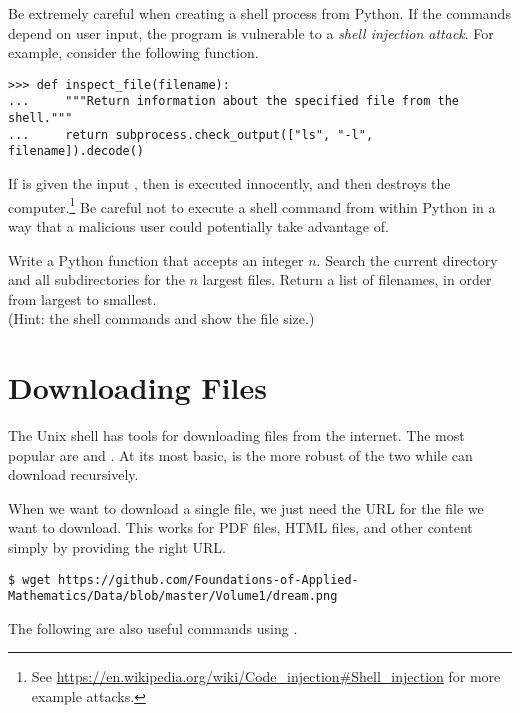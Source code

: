 \begin{warn}
Be extremely careful when creating a shell process from Python.
If the commands depend on user input, the program is vulnerable to a \emph{shell injection attack}.
For example, consider the following function.
\begin{lstlisting}
>>> def inspect_file(filename):
...     """Return information about the specified file from the shell."""
...     return subprocess.check_output(["ls", "-l", filename]).decode()
\end{lstlisting}
If  is given the input , then  is executed innocently, and then  destroys the computer.\footnote{See \url{https://en.wikipedia.org/wiki/Code_injection\#Shell_injection} for more example attacks.}
Be careful not to execute a shell command from within Python in a way that a malicious user could potentially take advantage of.
\end{warn}


\begin{problem}
Write a Python function that accepts an integer $n$.
Search the current directory and all subdirectories for the $n$ largest files.
Return a list of filenames, in order from largest to smallest.
\\(Hint: the shell commands  and  show the file size.)
\end{problem}

\section*{Downloading Files} %

The Unix shell has tools for downloading files from the internet.
The most popular are  and .
At its most basic,  is the more robust of the two while  can download recursively.

When we want to download a single file, we just need the URL for the file we want to download.
This works for PDF files, HTML files, and other content simply by providing the right URL.

\begin{lstlisting}
$ wget https://github.com/Foundations-of-Applied-Mathematics/Data/blob/master/Volume1/dream.png
\end{lstlisting}

The following are also useful commands using .

